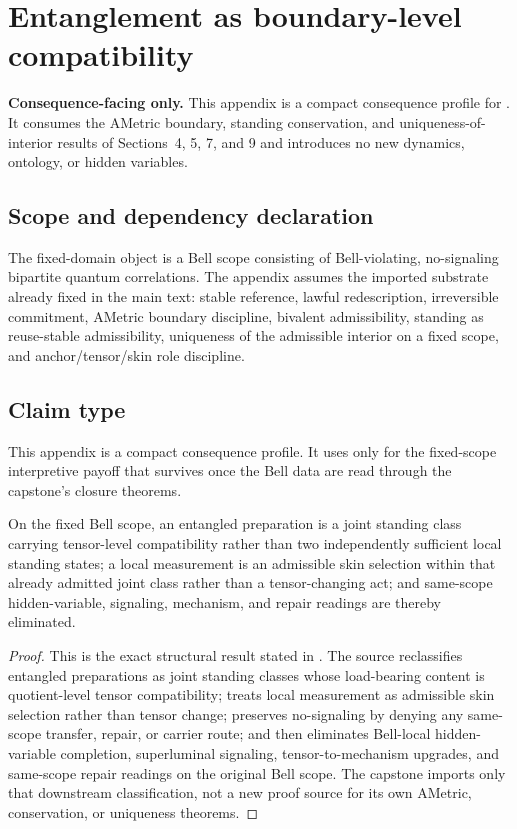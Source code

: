 \section{Entanglement as boundary-level compatibility}
\label{app:entanglement}

\begin{fixedbox}
\textbf{Consequence-facing only.} This appendix is a compact consequence profile for \entanglementdoc{}. It consumes the AMetric boundary, standing conservation, and uniqueness-of-interior results of Sections~4, 5, 7, and 9 and introduces no new dynamics, ontology, or hidden variables.
\end{fixedbox}

\subsection*{Scope and dependency declaration}
The fixed-domain object is a Bell scope consisting of Bell-violating, no-signaling bipartite quantum correlations. The appendix assumes the imported substrate already fixed in the main text: stable reference, lawful redescription, irreversible commitment, AMetric boundary discipline, bivalent admissibility, standing as reuse-stable admissibility, uniqueness of the admissible interior on a fixed scope, and anchor/tensor/skin role discipline.

\subsection*{Claim type}
This appendix is a compact consequence profile. It uses \entanglementdoc{} only for the fixed-scope interpretive payoff that survives once the Bell data are read through the capstone's closure theorems.

\begin{proposition}
On the fixed Bell scope, an entangled preparation is a joint standing class carrying tensor-level compatibility rather than two independently sufficient local standing states; a local measurement is an admissible skin selection within that already admitted joint class rather than a tensor-changing act; and same-scope hidden-variable, signaling, mechanism, and repair readings are thereby eliminated.
\end{proposition}

\begin{proof}
This is the exact structural result stated in \entanglementdoc{}. The source reclassifies entangled preparations as joint standing classes whose load-bearing content is quotient-level tensor compatibility; treats local measurement as admissible skin selection rather than tensor change; preserves no-signaling by denying any same-scope transfer, repair, or carrier route; and then eliminates Bell-local hidden-variable completion, superluminal signaling, tensor-to-mechanism upgrades, and same-scope repair readings on the original Bell scope. The capstone imports only that downstream classification, not a new proof source for its own AMetric, conservation, or uniqueness theorems.\cite{MaleyEntanglementBoundary}
\end{proof}

